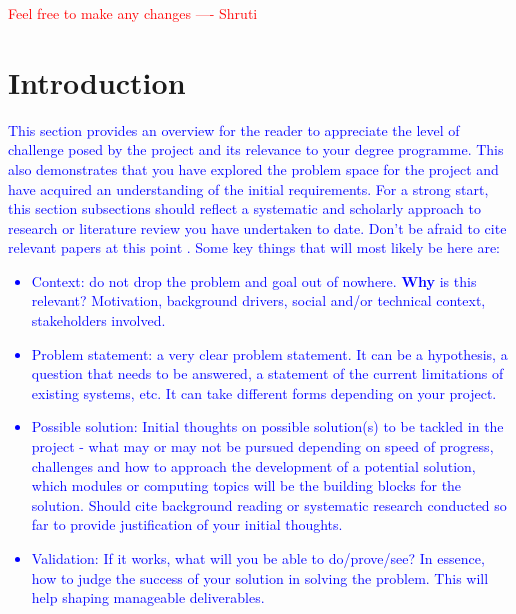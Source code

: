 \documentclass[acmtog, nonacm]{acmart}
\begin{document}



\maketitle
\textcolor{red}{Feel free to make any changes ---- Shruti}

\section{Introduction}
\textcolor{blue}{This section provides an overview for the reader to appreciate the level of challenge posed by the project and its relevance to your degree programme. 
This also demonstrates that you have explored the problem space for the project and have acquired an understanding of the initial requirements.
For a strong start, this section subsections should reflect a systematic and scholarly approach to research or literature review you have undertaken to date.
Don't be afraid to cite relevant papers at this point \cite{graphics}.
Some key things that will most likely be here are:
\begin{itemize}
    \item Context: do not drop the problem and goal out of nowhere. \textbf{Why} is this relevant? Motivation, background drivers, social and/or technical context, stakeholders involved.
    \item Problem statement: a very clear problem statement. It can be a hypothesis, a question that needs to be answered, a statement of the current limitations of existing systems, etc. It can take different forms depending on your project.
    \item Possible solution: Initial thoughts on possible solution(s) to be tackled in the project - what may or may not be pursued depending on speed of progress, challenges and how to approach the development of a potential solution, which modules or computing topics will be the building blocks for the solution.
    Should cite background reading or systematic research conducted so far to provide justification of your initial thoughts.
    \item Validation: If it works, what will you be able to do/prove/see? In essence, how to judge the success of your solution in solving the problem. This will help shaping manageable deliverables. 
\end{itemize}
}
\end{document}
